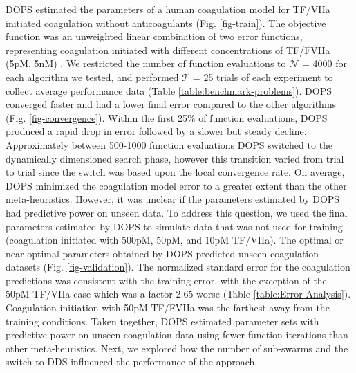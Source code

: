\documentclass{bmcart}
\begin{document}
DOPS estimated the parameters of a human coagulation model for TF/VIIa initiated coagulation without anticoagulants (Fig. \ref{fig-train}).
The objective function was an unweighted linear combination of two error functions,
representing coagulation initiated with different concentrations of TF/FVIIa (5pM, 5nM) \cite{hockin2002model}.
We restricted the number of function evaluations to $\mathcal{N}$ = 4000 for each algorithm we tested, and performed $\mathcal{T}$ = 25 trials of each experiment to collect average performance data (Table \ref{table:benchmark-problems}).
DOPS converged faster and had a lower final error compared to the other algorithms (Fig. \ref{fig-convergence}).
Within the first 25\% of function evaluations, DOPS produced a rapid drop in error followed by a slower but steady decline.
Approximately between 500-1000 function evaluations DOPS switched to the dynamically dimensioned search phase, however this transition varied from trial to trial since the switch was based upon the local convergence rate.
On average, DOPS minimized the coagulation model error to a greater extent than the other meta-heuristics.
However, it was unclear if the parameters estimated by DOPS had predictive power on unseen data.
To address this question, we used the final parameters estimated by
DOPS to simulate data that was not used for training (coagulation initiated with 500pM, 50pM, and 10pM TF/VIIa).
The optimal or near optimal parameters obtained by DOPS predicted unseen coagulation datasets (Fig. \ref{fig-validation}).
The normalized standard error for the coagulation predictions was consistent with the training error, with the exception of the 50pM TF/VIIa case which was a factor 2.65 worse (Table \ref{table:Error-Analysis}).
Coagulation initiation with 50pM TF/FVIIa was the farthest away from the training conditions.
Taken together, DOPS estimated parameter sets with predictive power on unseen coagulation data using fewer function iterations than other meta-heuristics.
Next, we explored how the number of sub-swarms and the switch to DDS influenced the performance of the approach.
\end{document}
